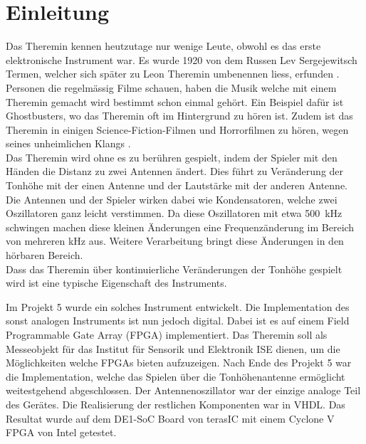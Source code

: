 \clearpage
\section{Einleitung}\label{sec:Einleitung}
Das Theremin kennen heutzutage nur wenige Leute, obwohl es das erste elektronische Instrument war. Es wurde 1920 von dem Russen Lev Sergejewitsch Termen, welcher sich später zu Leon Theremin umbenennen liess, erfunden \cite{Theremin_h}. Personen die regelmässig Filme schauen, haben die Musik welche mit einem Theremin gemacht wird bestimmt schon einmal gehört. Ein Beispiel dafür ist Ghostbusters, wo das Theremin oft im Hintergrund zu hören ist. Zudem ist das Theremin in einigen Science-Fiction-Filmen und Horrorfilmen zu hören, wegen seines unheimlichen Klangs \cite{Goast_m}.\\
Das Theremin wird ohne es zu berühren gespielt, indem der Spieler mit den Händen die Distanz zu zwei Antennen ändert. Dies führt zu Veränderung der Tonhöhe mit der einen Antenne und der Lautstärke mit der anderen Antenne. Die Antennen und der Spieler wirken dabei wie Kondensatoren, welche zwei Oszillatoren ganz leicht verstimmen. Da diese Oszillatoren mit etwa \SI{500}{kHz} schwingen machen diese kleinen Änderungen eine Frequenzänderung im Bereich von mehreren kHz aus. Weitere Verarbeitung bringt diese Änderungen in den hörbaren Bereich. \\
Dass das Theremin über kontinuierliche Veränderungen der Tonhöhe gespielt wird ist eine typische Eigenschaft des Instruments.

Im Projekt 5 wurde ein solches Instrument entwickelt. Die Implementation des sonst analogen Instruments ist nun jedoch digital. Dabei ist es auf einem Field Programmable Gate Array (FPGA) implementiert. Das Theremin soll als Messeobjekt für das Institut für Sensorik und Elektronik ISE dienen, um die Möglichkeiten welche FPGAs bieten aufzuzeigen. Nach Ende des Projekt 5 war die Implementation, welche das Spielen über die Tonhöhenantenne ermöglicht weitestgehend abgeschlossen. Der Antennenoszillator war der einzige analoge Teil des Gerätes. Die Realisierung der restlichen Komponenten war in VHDL. Das Resultat wurde auf dem DE1-SoC Board von terasIC mit einem Cyclone V FPGA von Intel getestet.


